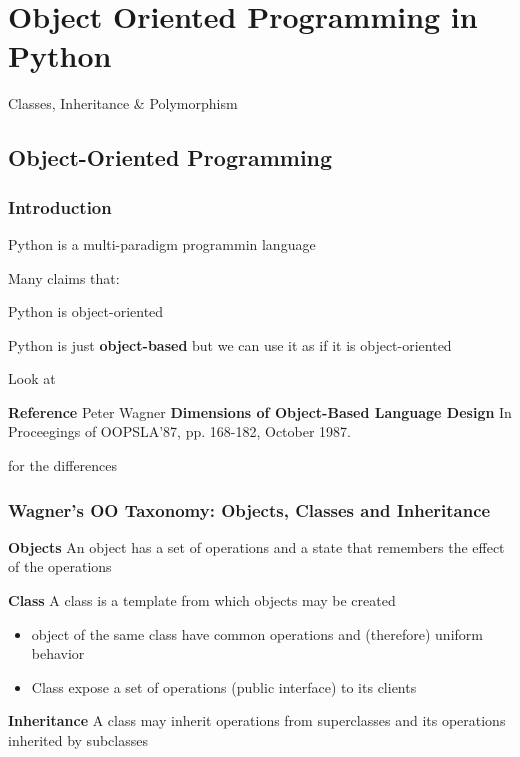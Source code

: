 \section{Object Oriented Programming in Python}

Classes, Inheritance \& Polymorphism

\subsection{Object-Oriented Programming}

\subsubsection{Introduction}

Python is a multi-paradigm programmin language

Many claims that:

\begin{center}
Python is object-oriented
\end{center}

Python is just \textbf{object-based} but we can use it as if it is object-oriented

Look at

\begin{center}
\textbf{Reference}
Peter Wagner
\textbf{Dimensions of Object-Based Language Design}
In Proceegings of OOPSLA'87, pp. 168-182, October 1987.
\end{center}

for the differences

\subsubsection{Wagner’s OO Taxonomy: Objects, Classes and Inheritance}

\textbf{Objects}
An object has a set of operations and a state that remembers the effect of the operations

\textbf{Class}
A class is a template from which objects may be created

\begin{itemize}
	\item object of the same class have common operations and (therefore) uniform behavior
	\item Class expose a set of operations (public interface) to its clients
\end{itemize}

\textbf{Inheritance}
A class may inherit operations from superclasses and its operations inherited by subclasses

